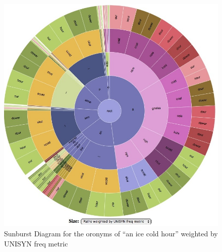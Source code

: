 \begin{figure}
\includegraphics[width=150mm]{aNiceColdHour_UNISYN_FreqMetric.jpg}
\captionfonts
\caption[Sunburst Diagram for the oronyms of ``an ice cold hour'' weighted by UNISYN freq metric]{Sunburst Diagram for the oronyms of ``an ice cold hour'' weighted by UNISYN freq metric }
\label{fig:oronymsunburst:anicecoldhourUNISYNWeight}
\end{figure}


